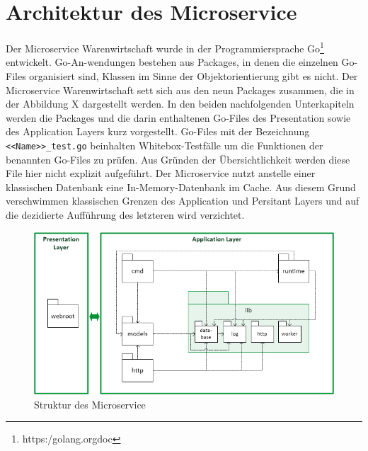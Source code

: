 \section{Architektur des Microservice}
\label{sec: Architektur des Microservice}
Der Microservice Warenwirtschaft wurde in der Programmiersprache Go\footnote{https:\//golang.org\/doc\/} entwickelt. Go-An-wendungen bestehen aus Packages, in denen die einzelnen Go-Files organisiert sind, Klassen im Sinne der Objektorientierung gibt es nicht. Der Microservice Warenwirtschaft sett sich aus den neun Packages zusammen, die in der Abbildung X dargestellt werden. In den beiden nachfolgenden Unterkapiteln werden die Packages und die darin enthaltenen Go-Files des Presentation  sowie des Application Layers kurz vorgestellt. Go-Files mit der Bezeichnung \texttt{<<Name>>\_test.go} beinhalten Whitebox-Testfälle um die Funktionen der benannten Go-Files zu prüfen. Aus Gründen der Übersichtlichkeit werden diese File hier nicht explizit aufgeführt. 
Der Microservice nutzt anstelle einer klassischen Datenbank eine In-Memory-Datenbank im Cache. Aus diesem Grund verschwimmen klassischen Grenzen des Application und Persitant Layers und auf die dezidierte Aufführung des letzteren wird verzichtet.

\begin{figure}[H]
	\begin{center}
	\includegraphics[width=0.95 \textwidth]{./pics/struktur.png}
	\end{center}
	\caption{Struktur des Microservice}
	\label{pic:Struktur des Microservice}
\end{figure}

\newpage
